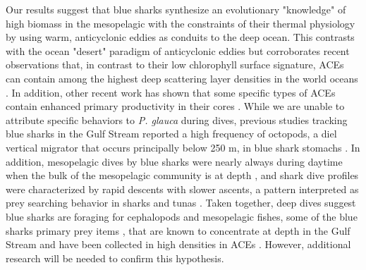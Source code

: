Our results suggest that blue sharks synthesize an evolutionary "knowledge" of high biomass in the mesopelagic with the constraints of their thermal physiology by using warm, anticyclonic eddies as conduits to the deep ocean. This contrasts with the ocean "desert" paradigm of anticyclonic eddies but corroborates recent observations that, in contrast to their low chlorophyll surface signature, ACEs can contain among the highest deep scattering layer densities in the world oceans \citep{Fennell2015}. In addition, other recent work has shown that some specific types of ACEs contain enhanced primary productivity in their cores \citep{Dufois2016}. While we are unable to attribute specific behaviors to \textit{P. glauca} during dives, previous studies tracking blue sharks in the Gulf Stream reported a high frequency of octopods, a diel vertical migrator that occurs principally below 250 m, in blue shark stomachs \citep{Carey1990}. In addition, mesopelagic dives by blue sharks were nearly always during daytime when the bulk of the mesopelagic community is at depth \citep{Bianchi2013}, and shark dive profiles were characterized by rapid descents with slower ascents, a pattern interpreted as prey searching behavior in sharks and tunas \citep{Carey1990, Brunnschweiler2009}. Taken together, deep dives suggest blue sharks are foraging for cephalopods and mesopelagic fishes, some of the blue sharks primary prey items \citep{Nakano2008}, that are known to concentrate at depth in the Gulf Stream \citep{Fedulov1986} and have been collected in high densities in ACEs \citep{Fennell2015, godo2012mesoscale}. However, additional research will be needed to confirm this hypothesis.

